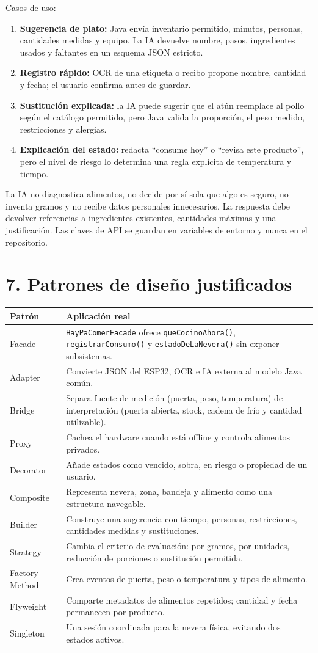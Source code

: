 \documentclass[11pt,a4paper]{article}
\newcommand{\code}[1]{\texttt{#1}}
\newcommand{\titulo}[1]{\section*{#1}\addcontentsline{toc}{section}{#1}}
\begin{document}
Casos de uso:
\begin{enumerate}
\item \textbf{Sugerencia de plato:} Java envía inventario permitido, minutos, personas, cantidades medidas y equipo. La IA devuelve nombre, pasos, ingredientes usados y faltantes en un esquema JSON estricto.
\item \textbf{Registro rápido:} OCR de una etiqueta o recibo propone nombre, cantidad y fecha; el usuario confirma antes de guardar.
\item \textbf{Sustitución explicada:} la IA puede sugerir que el atún reemplace al pollo según el catálogo permitido, pero Java valida la proporción, el peso medido, restricciones y alergias.
\item \textbf{Explicación del estado:} redacta ``consume hoy'' o ``revisa este producto'', pero el nivel de riesgo lo determina una regla explícita de temperatura y tiempo.
\end{enumerate}

La IA no diagnostica alimentos, no decide por sí sola que algo es seguro, no inventa gramos y no recibe datos personales innecesarios. La respuesta debe devolver referencias a ingredientes existentes, cantidades máximas y una justificación. Las claves de API se guardan en variables de entorno y nunca en el repositorio.

\titulo{7. Patrones de diseño justificados}
\begin{longtable}{p{3.5cm} p{10.5cm}}
\toprule
\textbf{Patrón} & \textbf{Aplicación real}\\
\midrule
Facade & \code{HayPaComerFacade} ofrece \code{queCocinoAhora()}, \code{registrarConsumo()} y \code{estadoDeLaNevera()} sin exponer subsistemas.\\
Adapter & Convierte JSON del ESP32, OCR e IA externa al modelo Java común.\\
Bridge & Separa fuente de medición (puerta, peso, temperatura) de interpretación (puerta abierta, stock, cadena de frío y cantidad utilizable).\\
Proxy & Cachea el hardware cuando está offline y controla alimentos privados.\\
Decorator & Añade estados como vencido, sobra, en riesgo o propiedad de un usuario.\\
Composite & Representa nevera, zona, bandeja y alimento como una estructura navegable.\\
Builder & Construye una sugerencia con tiempo, personas, restricciones, cantidades medidas y sustituciones.\\
Strategy & Cambia el criterio de evaluación: por gramos, por unidades, reducción de porciones o sustitución permitida.\\
Factory Method & Crea eventos de puerta, peso o temperatura y tipos de alimento.\\
Flyweight & Comparte metadatos de alimentos repetidos; cantidad y fecha permanecen por producto.\\
Singleton & Una sesión coordinada para la nevera física, evitando dos estados activos.\\
\bottomrule
\end{longtable}
\end{document}
